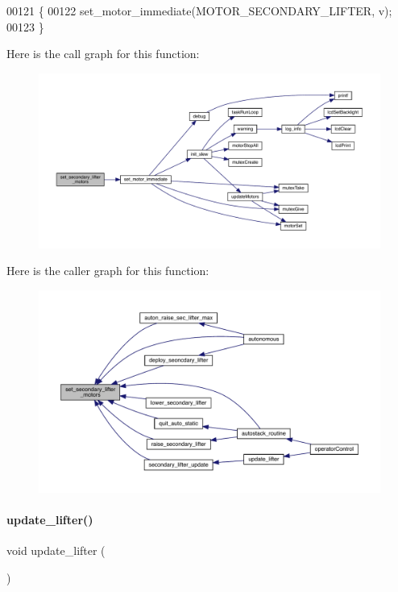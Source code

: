 \begin{DoxyCode}
00121                                               \{
00122   set_motor_immediate(MOTOR\_SECONDARY\_LIFTER, v);
00123 \}
\end{DoxyCode}
Here is the call graph for this function\+:
\nopagebreak
\begin{figure}[H]
\begin{center}
\leavevmode
\includegraphics[width=350pt]{lifter_8c_a78640d547d9361951a92d0bc00939536_cgraph}
\end{center}
\end{figure}
Here is the caller graph for this function\+:
\nopagebreak
\begin{figure}[H]
\begin{center}
\leavevmode
\includegraphics[width=350pt]{lifter_8c_a78640d547d9361951a92d0bc00939536_icgraph}
\end{center}
\end{figure}
\mbox{\label{lifter_8c_a59bb7413777ca16aba124aaedf95c79b}} 
\paragraph{update\+\_\+lifter()}
{\footnotesize\ttfamily void update\+\_\+lifter (\begin{DoxyParamCaption}{ }\end{DoxyParamCaption})}



